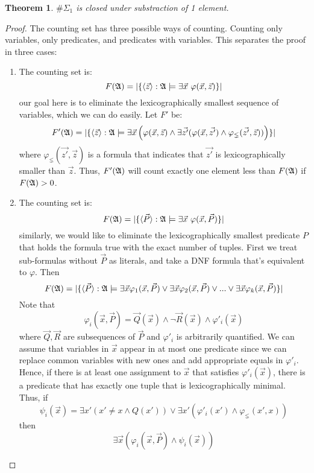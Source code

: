 \documentclass[12pt]{article}
\def\A{{\frak A}}
\newtheorem{theo}{Theorem}
\begin{document}
\begin{theo}
$\#\Sigma_1$ is closed under substraction of 1 element.
\end{theo}
\begin{proof}
The counting set has three possible ways of counting. Counting only variables, only predicates, and predicates with variables. This separates the proof in three cases:
\begin{enumerate}
\item The counting set is:
$$
F(\A) = \vert \{ \langle\vec{z}\rangle :\A \models \exists \vec{x} \ \varphi(\vec{x},\vec{z}) \} \vert
$$
our goal here is to eliminate the lexicographically smallest sequence of variables, which we can do easily. Let $F'$ be:
$$
F'(\A) = \vert \{ \langle\vec{z}\rangle :\A \models \exists \vec{x}\left( \varphi(\vec{x},\vec{z}) \wedge \exists \vec{z'} (\varphi(\vec{x},\vec{z'}) \wedge \varphi_{\lneq}(\vec{z'},\vec{z} ) ) \right) \} \vert
$$
where $\varphi_{\lneq}(\vec{z'},\vec{z})$ is a formula that indicates that $\vec{z'}$ is lexicographically smaller than $\vec{z}$. Thus, $F'(\A)$ will count exactly one element less than $F(\A)$ if $F(\A)>0$.
\item The counting set is:
$$
F(\A) = \vert \{ \langle\vec{P}\rangle :\A \models \exists \vec{x} \ \varphi(\vec{x},\vec{P}) \} \vert
$$
similarly, we would like to eliminate the lexicographically smallest predicate $P$ that holds the formula true with the exact number of tuples. First we treat sub-formulas without $\vec{P}$ as literals, and take a DNF formula that's equivalent to $\varphi$. Then
$$
F(\A) = \vert \{ \langle\vec{P}\rangle :\A \models 
\exists \vec{x} \varphi_1(\vec{x},\vec{P}) \vee
\exists \vec{x} \varphi_2(\vec{x},\vec{P}) \vee
... \vee
\exists \vec{x} \varphi_k(\vec{x},\vec{P})
 \} \vert
$$
Note that
$$
\varphi_i(\vec{x},\vec{P}) = \vec{Q}(\vec{x}) \wedge \neg \vec{R}(\vec{x}) \wedge \varphi'_i(\vec{x})
$$
where $\vec{Q},\vec{R}$ are subsequences of $\vec{P}$ and $\varphi'_i$ is arbitrarily quantified. We can assume that variables in $\vec{x}$ appear in at most one predicate since we can replace common variables with new ones and add appropriate equals in $\varphi'_i$. Hence, if there is at least one assignment to $\vec{x}$ that satisfies $\varphi'_i(\vec{x})$, there is a predicate that has exactly one tuple that is lexicographically minimal. Thus, if
$$
\psi_i(\vec{x}) = \exists x' (x' \neq x \wedge Q(x')) \vee \exists x' (\varphi'_i(x') \wedge \varphi_{\lneq}(x',x))
$$
then 
$$
\exists \vec{x} \left( \varphi_i(\vec{x},\vec{P}) \wedge \psi_i(\vec{x}) \right)
$$
\end{enumerate}
\end{proof}
\end{document}
